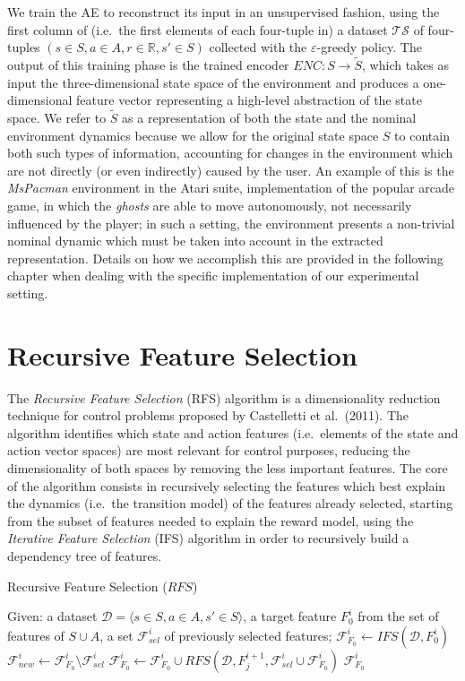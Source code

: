 We train the AE to reconstruct its input in an unsupervised fashion, using the 
first column of (i.e.\ the first elements of each four-tuple in) a dataset 
$\mathcal{TS}$ of four-tuples $(s \in S, a \in A, r \in \mathbb{R}, s' \in S)$ 
collected with the $\varepsilon$-greedy policy. 
The output of this training phase is the trained encoder 
$ENC: S \rightarrow \tilde{S}$, which takes as input the three-dimensional 
state space of the environment and produces a one-dimensional feature vector
representing a high-level abstraction of the state space.
We refer to $\tilde{S}$ as a representation of both the state and the nominal 
environment dynamics because we allow for the original state space $S$ to 
contain both such types of information, accounting for changes in the 
environment which are not directly (or even indirectly) caused by the user. 
An example of this is the \textit{MsPacman} environment in the Atari suite, 
implementation of the popular arcade game, in which the \textit{ghosts} are able
to move autonomously, not necessarily influenced by the player; in such a 
setting, the environment presents a non-trivial nominal dynamic which must be 
taken into account in the extracted representation. Details on how we accomplish 
this are provided in the following chapter when dealing with the specific 
implementation of our experimental setting.

\section{Recursive Feature Selection}
The \textit{Recursive Feature Selection} (RFS) \cite{castelletti2011tree} 
algorithm is a dimensionality reduction technique for control problems proposed
by Castelletti et al.\ (2011). 
The algorithm identifies which state and action features (i.e.\ elements of the 
state and action vector spaces) are most relevant for control purposes, reducing
the dimensionality of both spaces by removing the less important features.
The core of the algorithm consists in recursively selecting the features which 
best explain the dynamics (i.e.\ the transition model) of the features already 
selected, starting from the subset of features needed to explain the reward 
model, using the \textit{Iterative Feature Selection} (IFS) 
\cite{castelletti2013iter} algorithm in order to recursively build a dependency 
tree of features.
%
\begin{algorithm}[h]
    \caption{Recursive Feature Selection ($RFS$)}
    \label{alg:RFS}
    \begin{algorithmic}
	\STATE Given: a dataset $\mathcal{D} = {\langle s \in S, a \in A, s' \in S \rangle}$, a target feature $F_0^i$ from the set of features of $S \cup A$, a set $\mathcal{F}_{sel}^i$ of previously selected features;
	\STATE $\mathcal{F}_{F_0}^i \leftarrow IFS(\mathcal{D}, F_0^i)$
	\STATE $\mathcal{F}_{new}^i \leftarrow \mathcal{F}_{F_0}^i \setminus \mathcal{F}_{sel}^i$
	    \STATE $\mathcal{F}_{F_0}^i \leftarrow \mathcal{F}_{F_0}^i \cup RFS(\mathcal{D}, F_j^{i+1}, \mathcal{F}_{sel}^i \cup \mathcal{F}_{F_0}^i)$
	\ENDFOR
	\RETURN $\mathcal{F}_{F_0}^i$
    \end{algorithmic}
\end{algorithm}
%

